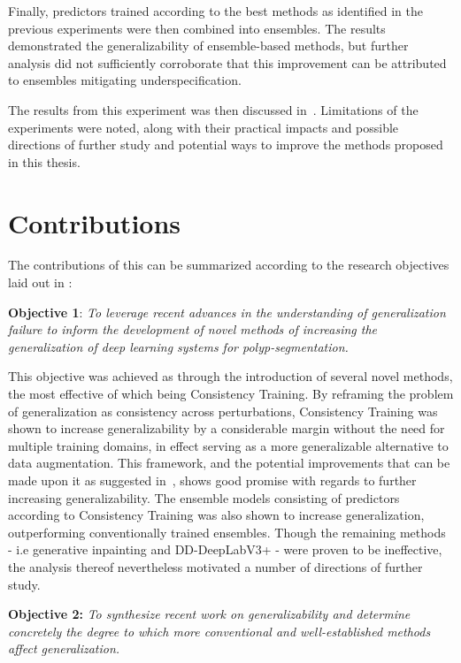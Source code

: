 Finally, predictors trained according to the best methods as identified in the previous experiments were then combined into ensembles. The results demonstrated the generalizability of ensemble-based methods, but further analysis did not sufficiently corroborate that this improvement can be attributed to ensembles mitigating underspecification. 

The results from this experiment was then discussed in~. Limitations of the experiments were noted, along with their practical impacts and possible directions of further study and potential ways to improve the methods proposed in this thesis. 


\section{Contributions}
The contributions of this can be summarized according to the research objectives laid out in :

\textbf{Objective 1}: \textit{To leverage recent advances in the understanding of generalization failure to inform the development of novel methods of increasing the generalization of deep learning systems for polyp-segmentation.}

This objective was achieved as through the introduction of several novel methods, the most effective of which being Consistency Training. By reframing the problem of generalization as consistency across perturbations, Consistency Training was shown to increase generalizability by a considerable margin without the need for multiple training domains, in effect serving as a more generalizable alternative to data augmentation. This framework, and the potential improvements that can be made upon it as suggested in~, shows good promise with regards to further increasing generalizability. The ensemble models consisting of predictors according to Consistency Training was also shown to increase generalization, outperforming conventionally trained ensembles. Though the remaining methods - i.e generative inpainting and DD-DeepLabV3+ - were proven to be ineffective, the analysis thereof nevertheless motivated a number of directions of further study. 

\textbf{Objective 2:} \textit{To synthesize recent work on generalizability and determine concretely the degree to which more conventional and well-established methods affect generalization.} 

